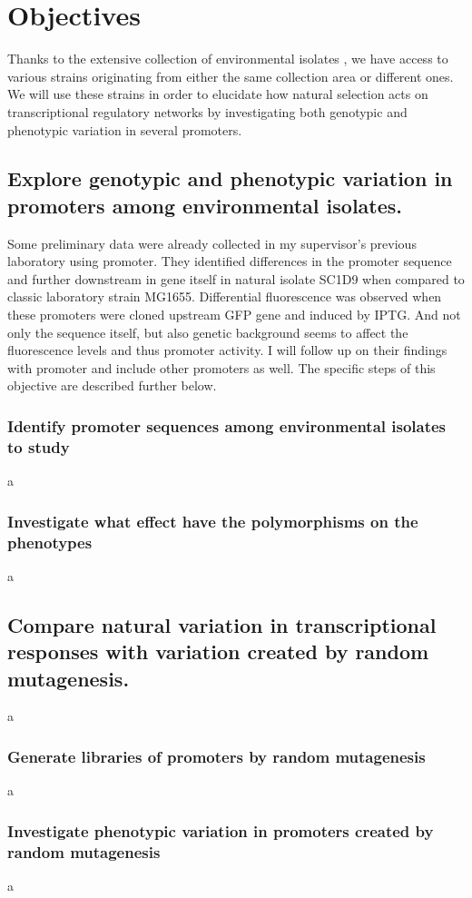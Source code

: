 \chapter{Objectives}

\shorthandoff{-} 

Thanks to the extensive collection of environmental  isolates \cite{ishii2006presence}, we have access to various strains originating from either the same collection area or different ones.
We will use these strains in order to elucidate how natural selection acts on transcriptional regulatory networks by investigating both genotypic and phenotypic variation in several promoters.

\section{Explore genotypic and phenotypic variation in promoters among environmental  isolates.}
Some preliminary data were already collected in my supervisor's previous laboratory using  promoter.
They identified differences in the promoter sequence and further downstream in  gene itself in natural isolate SC1\textunderscore D9 when compared to classic laboratory strain MG1655.
Differential fluorescence was observed when these promoters were cloned upstream GFP gene and induced by IPTG.
And not only the sequence itself, but also genetic background seems to affect the fluorescence levels and thus  promoter activity.
I will follow up on their findings with  promoter and include other promoters as well.
The specific steps of this objective are described further below.

\subsection{Identify promoter sequences among environmental  isolates to study}
a

\subsection{Investigate what effect have the polymorphisms on the phenotypes}
a




\section{Compare natural variation in transcriptional responses with variation created by random mutagenesis.}
a

\subsection{Generate libraries of promoters by random mutagenesis}
a

\subsection{Investigate phenotypic variation in promoters created by random mutagenesis}
a



\shorthandon{-} 
